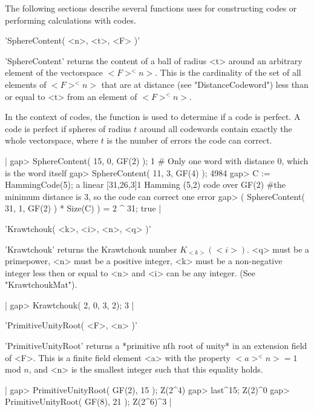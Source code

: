 The  following sections  describe  several  functions {\GUAVA} uses  for
constructing codes or performing calculations with codes.


'SphereContent( <n>, <t>, <F> )'

'SphereContent' returns the  content of a   ball of radius <t>  around an
arbitrary  element of the vectorspace $<F>^<n>$.  This is the cardinality
of  the set of    all elements of  $<F>^<n>$   that are at  distance (see
"DistanceCodeword")  less  than  or   equal to <t>   from  an  element of
$<F>^<n>$.

In the context of codes, the function  is used to  determine if a code is
perfect. A code is perfect if spheres  of radius $t$ around all codewords
contain exactly the whole vectorspace, where  $t$ is the number of errors
the code can correct.

|    gap> SphereContent( 15, 0, GF(2) );
    1    # Only one word with distance 0, which is the word itself
    gap> SphereContent( 11, 3, GF(4) );
    4984
    gap> C := HammingCode(5);
    a linear [31,26,3]1 Hamming (5,2) code over GF(2)
    #the minimum distance is 3, so the code can correct one error
    gap> ( SphereContent( 31, 1, GF(2) ) * Size(C) ) = 2 ^ 31;
    true |


'Krawtchouk( <k>, <i>, <n>, <q> )'

'Krawtchouk' returns the Krawtchouk number $K_{<k>}(<i>)$.  <q> must be a
primepower, <n> must  be a positive integer,  <k> must  be a non-negative
integer less  then  or equal to   <n> and <i> can   be any  integer. (See
"KrawtchoukMat").

|    gap> Krawtchouk( 2, 0, 3, 2);
    3 |


'PrimitiveUnityRoot( <F>, <n> )'

'PrimitiveUnityRoot'  returns a *primitive  n\'th  root of  unity* in  an
extension  field  of <F>. This  is a  finite  field element  <a> with the
property $<a>^<n>=1\ $mod $ n$, and <n> is the smallest integer such that
this equality holds.

|    gap> PrimitiveUnityRoot( GF(2), 15 );
    Z(2^4)
    gap> last^15;
    Z(2)^0
    gap> PrimitiveUnityRoot( GF(8), 21 );
    Z(2^6)^3 |

